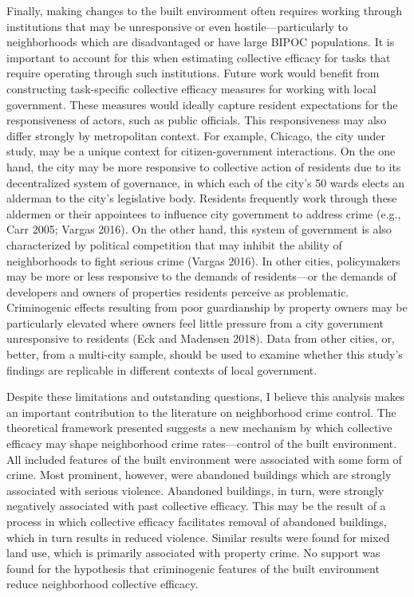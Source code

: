 \documentclass [11pt, proquest] {uwthesis}[2015/03/03]
\begin{document}
Finally, making changes to the built environment often requires working through institutions that may be unresponsive or even hostile---particularly to neighborhoods which are disadvantaged or have large BIPOC populations. It is important to account for this when estimating collective efficacy for tasks that require operating through such institutions. Future work would benefit from constructing task-specific collective efficacy measures for working with local government. These measures would ideally capture resident expectations for the responsiveness of actors, such as public officials. This responsiveness may also differ strongly by metropolitan context. For example, Chicago, the city under study, may be a unique context for citizen-government interactions. On the one hand, the city may be more responsive to collective action of residents due to its decentralized system of governance, in which each of the city's 50 wards elects an alderman to the city's legislative body. Residents frequently work through these aldermen or their appointees to influence city government to address crime (e.g., Carr 2005; Vargas 2016). On the other hand, this system of government is also characterized by political competition that may inhibit the ability of neighborhoods to fight serious crime (Vargas 2016). In other cities, policymakers may be more or less responsive to the demands of residents---or the demands of developers and owners of properties residents perceive as problematic. Criminogenic effects resulting from poor guardianship by property owners may be particularly elevated where owners feel little pressure from a city government unresponsive to residents (Eck and Madensen 2018). Data from other cities, or, better, from a multi-city sample, should be used to examine whether this study's findings are replicable in different contexts of local government.

Despite these limitations and outstanding questions, I believe this analysis makes an important contribution to the literature on neighborhood crime control. The theoretical framework presented suggests a new mechanism by which collective efficacy may shape neighborhood crime rates---control of the built environment. All included features of the built environment were associated with some form of crime. Most prominent, however, were abandoned buildings which are strongly associated with serious violence. Abandoned buildings, in turn, were strongly negatively associated with past collective efficacy. This may be the result of a process in which collective efficacy facilitates removal of abandoned buildings, which in turn results in reduced violence. Similar results were found for mixed land use, which is primarily associated with property crime. No support was found for the hypothesis that criminogenic features of the built environment reduce neighborhood collective efficacy.
\end{document}
